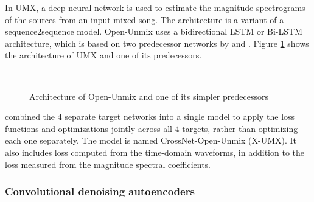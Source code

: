 \documentclass[report.tex]{subfiles}
\begin{document}
In UMX, a deep neural network is used to estimate the magnitude spectrograms of the sources from an input mixed song. The architecture is a variant of a sequence2sequence model. Open-Unmix uses a bidirectional LSTM or Bi-LSTM architecture, which is based on two predecessor networks by \textcite{umxorig1} and \textcite{umxorig2}. Figure \ref{fig:umxes} shows the architecture of UMX and one of its predecessors.

\begin{figure}[ht]
	\centering
	\\
	\caption{Architecture of Open-Unmix and one of its simpler predecessors}
	\label{fig:umxes}
\end{figure}


\textcite{xumx} combined the 4 separate target networks into a single model to apply the loss functions and optimizations jointly across all 4 targets, rather than optimizing each one separately. The model is named CrossNet-Open-Unmix (X-UMX). It also includes loss computed from the time-domain waveforms, in addition to the loss measured from the magnitude spectral coefficients.

\subsubsection{Convolutional denoising autoencoders}
\end{document}
